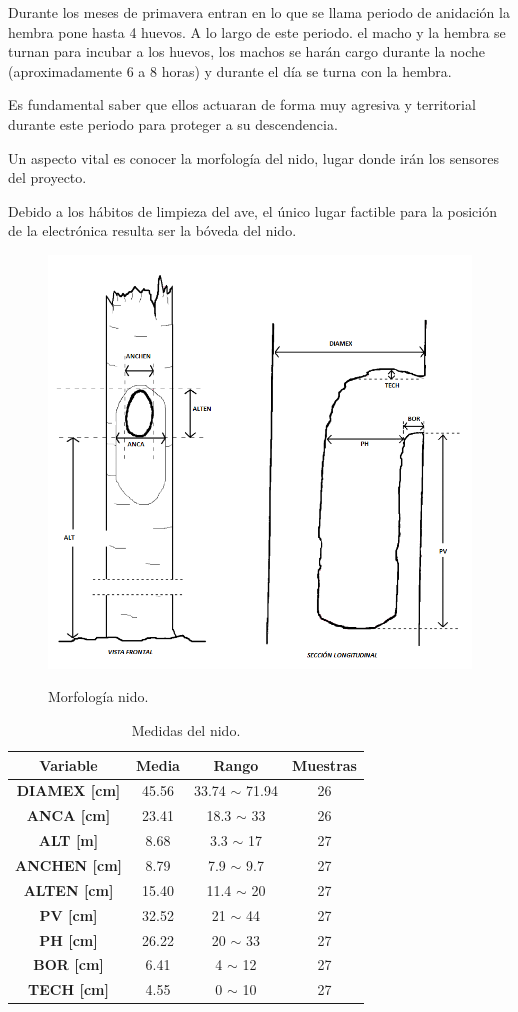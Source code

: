 Durante los meses de primavera entran en lo que se llama periodo de anidación la hembra pone hasta 4 huevos. A lo largo de este periodo. el macho y la hembra se turnan para incubar a los huevos, los machos se harán cargo durante la noche (aproximadamente 6 a 8 horas) y durante el día se turna con la hembra.

Es fundamental saber que ellos actuaran de forma muy agresiva y territorial durante este periodo para proteger a su descendencia.

Un aspecto vital es conocer la morfología del nido, lugar donde irán los sensores del proyecto.

Debido a los hábitos de limpieza del ave, el único lugar factible para la posición de la electrónica resulta ser la bóveda del nido. 
\begin{figure}[H]
	\centering
	\includegraphics[width=0.5\linewidth]{ImagenesIntroduccion/morfologia_nido}
	\label{fig:morfología_nido}
	\caption{Morfología nido.}
\end{figure}

\begin{table}[H]
\centering
\begin{tabular}{|c|c|c|c|}
\hline
\textbf{Variable}    & \textbf{Media} & \textbf{Rango}     & \textbf{Muestras} \\ \hline
\textbf{DIAMEX [cm]} & 45.56          & 33.74 $\sim$ 71.94 & 26                \\ \hline
\textbf{ANCA [cm]}   & 23.41          & 18.3 $\sim$ 33     & 26                \\ \hline
\textbf{ALT [m]}     & 8.68           & 3.3 $\sim$ 17      & 27                \\ \hline
\textbf{ANCHEN [cm]} & 8.79           & 7.9 $\sim$ 9.7     & 27                \\ \hline
\textbf{ALTEN [cm]}  & 15.40          & 11.4 $\sim$ 20     & 27                \\ \hline
\textbf{PV [cm]}     & 32.52          & 21 $\sim$ 44       & 27                \\ \hline
\textbf{PH [cm]}     & 26.22          & 20 $\sim$ 33       & 27                \\ \hline
\textbf{BOR [cm]}    & 6.41           & 4 $\sim$ 12        & 27                \\ \hline
\textbf{TECH [cm]}   & 4.55           & 0 $\sim$ 10        & 27                \\ \hline
\end{tabular}
\caption{Medidas del nido.}
\end{table}



